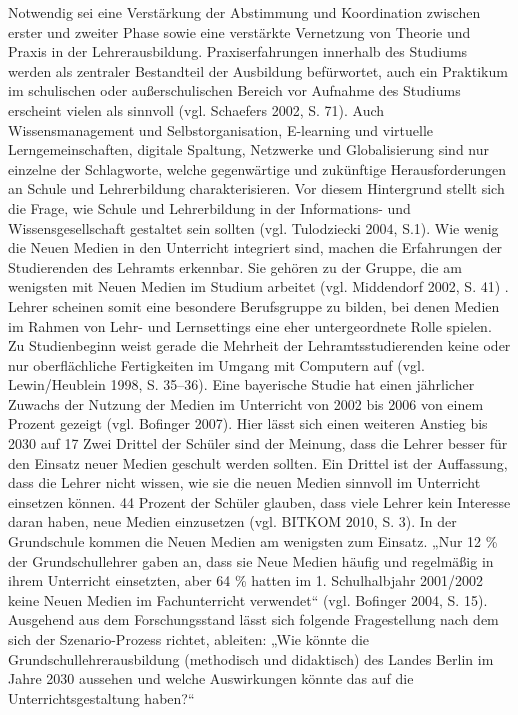 \documentclass[12pt,a4paper]{article}
\begin{document}
Notwendig sei eine Verstärkung der Abstimmung und Koordination zwischen erster und zweiter Phase sowie eine verstärkte Vernetzung von Theorie und Praxis in der Lehrerausbildung. Praxiserfahrungen innerhalb des Studiums werden als zentraler Bestandteil der Ausbildung befürwortet, auch ein Praktikum im schulischen oder außerschulischen Bereich vor Aufnahme des Studiums erscheint vielen als sinnvoll (vgl. Schaefers 2002, S. 71). Auch Wissensmanagement und Selbstorganisation, E-learning und virtuelle Lerngemeinschaften, digitale Spaltung, Netzwerke und Globalisierung sind nur einzelne der Schlagworte, welche gegenwärtige und zukünftige Herausforderungen an Schule und Lehrerbildung charakterisieren. Vor diesem Hintergrund stellt sich die Frage, wie Schule und Lehrerbildung in der Informations- und Wissensgesellschaft gestaltet sein sollten (vgl. Tulodziecki 2004, S.1)\cite{Tulodziecki2004}. 
Wie wenig die Neuen Medien in den Unterricht integriert sind, machen die Erfahrungen der Studierenden des Lehramts erkennbar. Sie gehören zu der Gruppe, die am wenigsten mit Neuen Medien im Studium arbeitet (vgl. Middendorf 2002, S. 41) \cite{Middendorf2002}. Lehrer scheinen somit eine besondere Berufsgruppe zu bilden, bei denen Medien im Rahmen von Lehr- und Lernsettings eine eher untergeordnete Rolle spielen. Zu Studienbeginn weist gerade die Mehrheit der Lehramtsstudierenden keine oder nur oberflächliche Fertigkeiten im Umgang mit Computern auf (vgl. Lewin/Heublein 1998, S. 35–36)\cite{Karl1998}.
Eine bayerische Studie hat einen jährlicher Zuwachs der Nutzung der Medien im Unterricht von 2002 bis 2006 von einem Prozent gezeigt (vgl. Bofinger 2007)\cite{Bericht2007}. Hier lässt sich einen weiteren Anstieg bis 2030 auf 17 %
Zwei Drittel der Schüler sind der Meinung, dass die Lehrer besser für den Einsatz neuer Medien geschult werden sollten. Ein Drittel ist der Auffassung, dass die Lehrer nicht wissen, wie sie die neuen Medien sinnvoll im Unterricht einsetzen können. 44 Prozent der Schüler glauben, dass viele Lehrer kein Interesse daran haben, neue Medien einzusetzen (vgl. BITKOM 2010, S. 3)\cite{BITKOM2010}. 
In der Grundschule kommen die Neuen Medien am wenigsten zum Einsatz. „Nur 12 \% der Grundschullehrer gaben an, dass sie Neue Medien häufig und regelmäßig in ihrem Unterricht einsetzten, aber 64 \% hatten im 1. Schulhalbjahr 2001/2002 keine Neuen Medien im Fachunterricht verwendet“ (vgl. Bofinger 2004, S. 15)\cite{Bofinger2004}.
Ausgehend aus dem Forschungsstand lässt sich folgende Fragestellung nach dem sich der Szenario-Prozess richtet, ableiten:
„Wie könnte die Grundschullehrerausbildung (methodisch und didaktisch) des Landes Berlin im Jahre 2030 aussehen und welche Auswirkungen könnte das auf die Unterrichtsgestaltung haben?“
\end{document}
